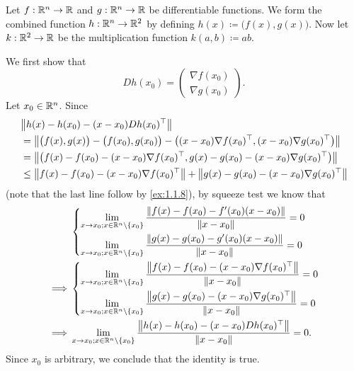 \begin{eg}\label{6.4.2}
  Let \(f : \R^n \to \R\) and \(g : \R^n \to \R\) be differentiable functions.
  We form the combined function \(h : \R^n \to \R^2\) by defining \(h(x) \coloneqq \big(f(x), g(x)\big)\).
  Now let \(k : \R^2 \to \R\) be the multiplication function \(k(a, b) \coloneqq ab\).

  We first show that
  \[
    D h(x_0) = \begin{pmatrix}
      \nabla f(x_0) \\
      \nabla g(x_0)
    \end{pmatrix}.
  \]
  Let \(x_0 \in \R^n\).
  Since
  \begin{align*}
     & \norm*{h(x) - h(x_0) - (x - x_0) D h(x_0)^\top}                                                                                  \\
     & = \norm*{\big(f(x), g(x)\big) - \big(f(x_0), g(x_0)\big) - \big((x - x_0) \nabla f(x_0)^\top, (x - x_0) \nabla g(x_0)^\top\big)} \\
     & = \norm*{\big(f(x) - f(x_0) - (x - x_0) \nabla f(x_0)^\top, g(x) - g(x_0) - (x - x_0) \nabla g(x_0)^\top\big)}                   \\
     & \leq \norm*{f(x) - f(x_0) - (x - x_0) \nabla f(x_0)^\top} + \norm*{g(x) - g(x_0) - (x - x_0) \nabla g(x_0)^\top}
  \end{align*}
  (note that the last line follow by \cref{ex:1.1.8}),
  by squeeze test we know that
  \begin{align*}
             & \begin{dcases}
                 \lim_{x \to x_0 ; x \in \R^n \setminus \{x_0\}} \dfrac{\norm*{f(x) - f(x_0) - f'(x_0)(x - x_0)}}{\norm*{x - x_0}} = 0 \\
                 \lim_{x \to x_0 ; x \in \R^n \setminus \{x_0\}} \dfrac{\norm*{g(x) - g(x_0) - g'(x_0)(x - x_0)}}{\norm*{x - x_0}} = 0
               \end{dcases}                    \\
    \implies & \begin{dcases}
                 \lim_{x \to x_0 ; x \in \R^n \setminus \{x_0\}} \dfrac{\norm*{f(x) - f(x_0) - (x - x_0) \nabla f(x_0)^\top}}{\norm*{x - x_0}} = 0 \\
                 \lim_{x \to x_0 ; x \in \R^n \setminus \{x_0\}} \dfrac{\norm*{g(x) - g(x_0) - (x - x_0) \nabla g(x_0)^\top}}{\norm*{x - x_0}} = 0
               \end{dcases}                    \\
    \implies & \lim_{x \to x_0 ; x \in \R^n \setminus \{x_0\}} \dfrac{\norm*{h(x) - h(x_0) - (x - x_0) D h(x_0)^\top}}{\norm*{x - x_0}} = 0.
  \end{align*}
  Since \(x_0\) is arbitrary, we conclude that the identity is true.


\end{eg}
